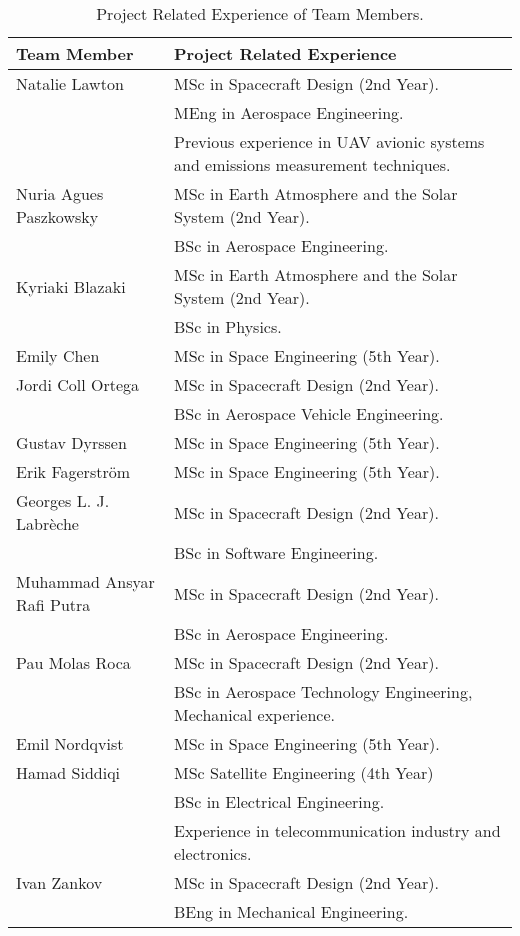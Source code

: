 \begin{table}[H]
\centering
\begin{tabular}{|l|m{9.8cm}|}
\hline
\textbf{Team Member} & \textbf{Project Related Experience} \\ \hline
Natalie Lawton & MSc in Spacecraft Design (2nd Year). \\& MEng in Aerospace Engineering.\\& Previous experience in UAV avionic systems and emissions measurement techniques. \\ \hline
Nuria Agues Paszkowsky & MSc in Earth Atmosphere and the Solar System (2nd Year). \\& BSc in Aerospace Engineering.\\ \hline
Kyriaki Blazaki & MSc in Earth Atmosphere and the Solar System (2nd Year). \\& BSc in Physics. \\ \hline
Emily Chen & MSc in Space Engineering (5th Year). \\ \hline
Jordi Coll Ortega & MSc in Spacecraft Design (2nd Year). \\& BSc in Aerospace Vehicle Engineering. \\ \hline
Gustav Dyrssen &  MSc in Space Engineering (5th Year).\\ \hline
Erik Fagerström & MSc in Space Engineering (5th Year). \\ \hline
Georges L. J. Labrèche & MSc in Spacecraft Design (2nd Year). \\& BSc in Software Engineering.\\ \hline
Muhammad Ansyar Rafi Putra & MSc in Spacecraft Design (2nd Year). \\& BSc in Aerospace Engineering. \\ \hline
Pau Molas Roca & MSc in Spacecraft Design (2nd Year). \\& BSc in Aerospace Technology Engineering, Mechanical experience. \\ \hline
Emil Nordqvist & MSc in Space Engineering (5th Year). \\ \hline
Hamad Siddiqi & MSc Satellite Engineering (4th Year) \\&  BSc in Electrical Engineering.\\& Experience in telecommunication industry and electronics.  \\ \hline
Ivan Zankov & MSc in Spacecraft Design (2nd Year). \\& BEng in Mechanical Engineering.\\ \hline
\end{tabular}
\caption{Project Related Experience of Team Members.}
\label{tab:team-member-experience}
\end{table}
\raggedbottom